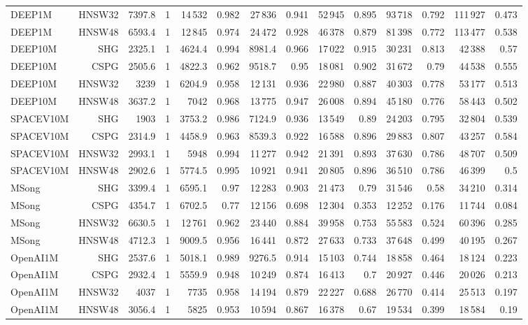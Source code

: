 \begin{table}[t]
\begin{tabular}{lrrrrrrrrrrrrr}
DEEP1M & HNSW32 & 7397.8 & 1 & 14\,532 & 0.982 & 27\,836 & 0.941 & 52\,945 & 0.895 & 93\,718 & 0.792 & 111\,927 & 0.473 \\
DEEP1M & HNSW48 & 6593.4 & 1 & 12\,845 & 0.974 & 24\,472 & 0.928 & 46\,378 & 0.879 & 81\,398 & 0.772 & 113\,477 & 0.538 \\
DEEP10M & SHG & 2325.1 & 1 & 4624.4 & 0.994 & 8981.4 & 0.966 & 17\,022 & 0.915 & 30\,231 & 0.813 & 42\,388 & 0.57 \\
DEEP10M & CSPG & 2505.6 & 1 & 4822.3 & 0.962 & 9518.7 & 0.95 & 18\,081 & 0.902 & 31\,672 & 0.79 & 44\,538 & 0.555 \\
DEEP10M & HNSW32 & 3239 & 1 & 6204.9 & 0.958 & 12\,131 & 0.936 & 22\,980 & 0.887 & 40\,303 & 0.778 & 53\,177 & 0.513 \\
DEEP10M & HNSW48 & 3637.2 & 1 & 7042 & 0.968 & 13\,775 & 0.947 & 26\,008 & 0.894 & 45\,180 & 0.776 & 58\,443 & 0.502 \\
SPACEV10M & SHG & 1903 & 1 & 3753.2 & 0.986 & 7124.9 & 0.936 & 13\,549 & 0.89 & 24\,203 & 0.795 & 32\,804 & 0.539 \\
SPACEV10M & CSPG & 2314.9 & 1 & 4458.9 & 0.963 & 8539.3 & 0.922 & 16\,588 & 0.896 & 29\,883 & 0.807 & 43\,257 & 0.584 \\
SPACEV10M & HNSW32 & 2993.1 & 1 & 5948 & 0.994 & 11\,277 & 0.942 & 21\,391 & 0.893 & 37\,630 & 0.786 & 48\,707 & 0.509 \\
SPACEV10M & HNSW48 & 2902.6 & 1 & 5774.5 & 0.995 & 10\,921 & 0.941 & 20\,805 & 0.896 & 36\,510 & 0.786 & 46\,399 & 0.5 \\
MSong & SHG & 3399.4 & 1 & 6595.1 & 0.97 & 12\,283 & 0.903 & 21\,473 & 0.79 & 31\,546 & 0.58 & 34\,210 & 0.314 \\
MSong & CSPG & 4354.7 & 1 & 6702.5 & 0.77 & 12\,156 & 0.698 & 12\,304 & 0.353 & 12\,252 & 0.176 & 11\,744 & 0.084 \\
MSong & HNSW32 & 6630.5 & 1 & 12\,761 & 0.962 & 23\,440 & 0.884 & 39\,958 & 0.753 & 55\,583 & 0.524 & 60\,396 & 0.285 \\
MSong & HNSW48 & 4712.3 & 1 & 9009.5 & 0.956 & 16\,441 & 0.872 & 27\,633 & 0.733 & 37\,648 & 0.499 & 40\,195 & 0.267 \\
OpenAI1M & SHG & 2537.6 & 1 & 5018.1 & 0.989 & 9276.5 & 0.914 & 15\,103 & 0.744 & 18\,858 & 0.464 & 18\,124 & 0.223 \\
OpenAI1M & CSPG & 2932.4 & 1 & 5559.9 & 0.948 & 10\,249 & 0.874 & 16\,413 & 0.7 & 20\,927 & 0.446 & 20\,026 & 0.213 \\
OpenAI1M & HNSW32 & 4037 & 1 & 7735 & 0.958 & 14\,194 & 0.879 & 22\,227 & 0.688 & 26\,770 & 0.414 & 25\,513 & 0.197 \\
OpenAI1M & HNSW48 & 3056.4 & 1 & 5825 & 0.953 & 10\,594 & 0.867 & 16\,378 & 0.67 & 19\,534 & 0.399 & 18\,584 & 0.19 \\
\bottomrule
\end{tabular}
\end{table}

